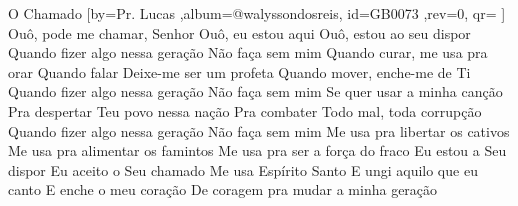 \beginsong
{O Chamado %
}[by={Pr. Lucas %
},album={@walyssondosreis},
id={GB0073 %
},rev={0}, %
qr={ %
}]
\beginchorus
Ouô, pode me chamar, Senhor
Ouô, eu estou aqui
Ouô, estou ao seu dispor
Quando fizer algo nessa geração
Não faça sem mim
\endchorus
\beginverse*
Quando curar, me usa pra orar
Quando falar
Deixe-me ser um profeta
Quando mover, enche-me de Ti
Quando fizer algo nessa geração
Não faça sem mim
\endverse
\beginverse*
Se quer usar a minha canção
Pra despertar
Teu povo nessa nação
Pra combater
Todo mal, toda corrupção
Quando fizer algo nessa geração
Não faça sem mim
\endverse
\beginverse*
Me usa pra libertar os cativos
Me usa pra alimentar os famintos
Me usa pra ser a força do fraco
Eu estou a Seu dispor
Eu aceito o Seu chamado
\endverse
\beginverse*
Me usa Espírito Santo
E ungi aquilo que eu canto
E enche o meu coração
De coragem pra mudar a minha geração
\endverse

